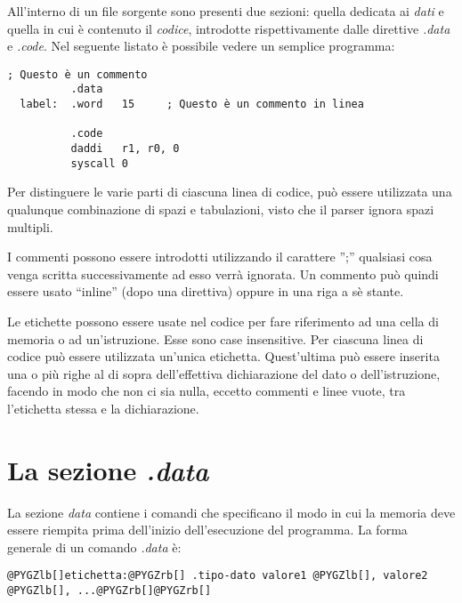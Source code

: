 \documentclass[letterpaper,10pt,english]{sphinxmanual}
\begin{document}
All'interno di un file sorgente sono presenti due sezioni: quella dedicata ai
\emph{dati} e quella in cui è contenuto il \emph{codice}, introdotte rispettivamente
dalle direttive \emph{.data} e \emph{.code}. Nel seguente listato è possibile vedere un
semplice programma:

\begin{Verbatim}[commandchars=@\[\]]
; Questo è un commento
          .data
  label:  .word   15     ; Questo è un commento in linea

          .code
          daddi   r1, r0, 0
          syscall 0
\end{Verbatim}

Per distinguere le varie parti di ciascuna linea di codice, può essere
utilizzata una qualunque combinazione di spazi e tabulazioni, visto che il
parser ignora spazi multipli.

I commenti possono essere introdotti utilizzando il carattere '';'' qualsiasi
cosa venga scritta successivamente ad esso verrà ignorata.  Un commento
può quindi essere usato ``inline'' (dopo una direttiva) oppure in una riga a
sè stante.

Le etichette possono essere usate nel codice per fare riferimento ad una cella
di memoria o ad un'istruzione.  Esse sono case insensitive. Per ciascuna linea
di codice può essere utilizzata un'unica etichetta. Quest'ultima può essere
inserita una o più righe al di sopra dell'effettiva dichiarazione del dato
o dell'istruzione, facendo in modo che non ci sia nulla, eccetto commenti e
linee vuote, tra l'etichetta stessa e la dichiarazione.


\section{La sezione \emph{.data}}
\label{source-files-format:la-sezione-data}
La sezione \emph{data} contiene i comandi che specificano il modo in cui la
memoria deve essere riempita prima dell'inizio dell'esecuzione del programma. La
forma generale di un comando \emph{.data} è:

\begin{Verbatim}[commandchars=@\[\]]
@PYGZlb[]etichetta:@PYGZrb[] .tipo-dato valore1 @PYGZlb[], valore2 @PYGZlb[], ...@PYGZrb[]@PYGZrb[]
\end{Verbatim}
\end{document}
